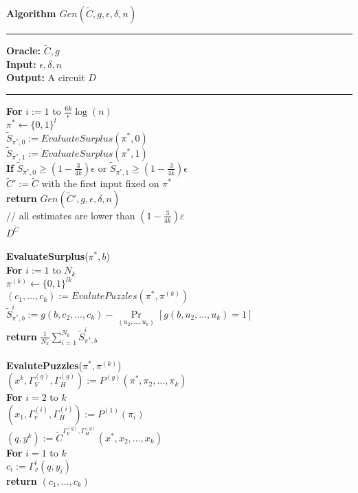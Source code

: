 \begin{codeblock}
  \textbf{Algorithm $Gen(\widetilde{C},g,\epsilon,\delta,n)$}
  \medskip

  \hrule

  \medskip

  \textbf{Oracle:} $\widetilde{C}, g$ \\
  \textbf{Input:}  $\epsilon, \delta, n$\\
  \textbf{Output:} A circuit $D$

  \medskip\hrule\medskip

  \textbf{For} $i:=1$ to $\frac{6k}{\epsilon}\log(n)$ \\
  \IndI $\pi^* \leftarrow \{0,1\}^{l}$\\
  \IndI $\widetilde{S}_{\pi^*,0} := EvaluateSurplus(\pi^*, 0)$\\
  \IndI $\widetilde{S}_{\pi^*,1} := EvaluateSurplus(\pi^*, 1)$\\
  \IndI \textbf{If} $\widetilde{S}_{\pi^*,0} \geq (1 - \frac{3}{4k}) \epsilon$ or $\widetilde{S}_{\pi^*,1} \geq (1 - \frac{3}{4k}) \epsilon$ \\
  \IndII $\widetilde{C}' := \widetilde{C}$ with the first input fixed on $\pi^*$\\
  \IndII\textbf{return} $Gen(\widetilde{C}', g, \epsilon, \delta, n)$ \\
  // all estimates are lower than $(1-\frac{3}{4k})\varepsilon$\\
  \return $D^{\widetilde{C}}$ \\
  \\
  \textbf{EvaluateSurplus}($\pi^*, b$) \\
  \IndI \textbf{For} $i:=1$ to $N_k$ \\
  \IndII $\pi^{(k)} \leftarrow \{0,1\}^{lk}$\\
  \IndII $(c_1, \dots, c_k) := EvalutePuzzles(\pi^*, \pi^{(k)})$\\
  \IndII $\widetilde{S}_{\pi^*,b}^i := g(b, c_2, \dots, c_k) - \underset{(u_2, \dots, u_k)}{\Pr}[g(b, u_2, \dots, u_k) = 1] $\\
  \IndI \textbf{return} $\frac{1}{N_k} \sum_{i=1}^{N_k} \widetilde{S}_{\pi^*,b}^i$\\
  \\
  \textbf{EvalutePuzzles}($\pi^*, \pi^{(k)}$)\\
  \IndI $(x^{k}, \Gamma_V^{(g)}, \Gamma_H^{(g)}) := P^{(g)}(\pi^*, \pi_2, \dots, \pi_k)$ \\
  \IndI \textbf{For} $i=2$ to $k$\\
  \IndII $(x_1, \Gamma_v^{(i)}, \Gamma_H^{(i)}) := P^{(1)}(\pi_i)$\\
  \IndI $(q,y^{k}) := \widetilde{C}^{\Gamma_V^{(g)}, \Gamma_H^{(g)}}(x^*, x_2, \dots, x_k)$\\
  \IndI \textbf{For} $i=1$ to $k$\\
  \IndII $c_i := \Gamma_v^{i}(q, y_i)$\\
  \IndI \textbf{return} $(c_1, \dots, c_k)$\\
\end{codeblock}

